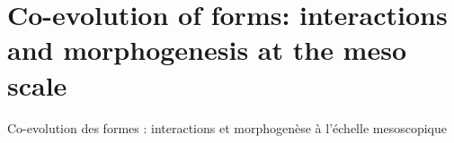 





\newpage

\section[Co-evolution at the meso scale][Co-évolution à l'échelle mesoscopique]{Co-evolution of forms: interactions and morphogenesis at the meso scale}{Co-evolution des formes : interactions et morphogenèse à l'échelle mesoscopique}


\label{sec:mesocoevolmodel}








